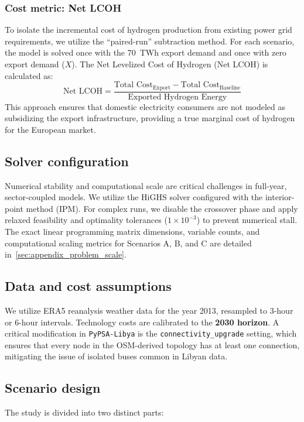 \documentclass[preprint,12pt]{elsarticle}
\begin{document}
\subsubsection{Cost metric: Net LCOH}
To isolate the incremental cost of hydrogen production from existing power grid requirements, we utilize the ``paired-run'' subtraction method. For each scenario, the model is solved once with the 70~TWh export demand and once with zero export demand ($X$). The Net Levelized Cost of Hydrogen (Net LCOH) is calculated as:
\begin{equation}
    \text{Net LCOH} = \frac{\text{Total Cost}_{\text{Export}} - \text{Total Cost}_{\text{Baseline}}}{\text{Exported Hydrogen Energy}}
\end{equation}
This approach ensures that domestic electricity consumers are not modeled as subsidizing the export infrastructure, providing a true marginal cost of hydrogen for the European market.

\subsection{Solver configuration}
Numerical stability and computational scale are critical challenges in full-year, sector-coupled models. We utilize the HiGHS solver configured with the interior-point method (IPM). For complex runs, we disable the crossover phase and apply relaxed feasibility and optimality tolerances ($1 \times 10^{-3}$) to prevent numerical stall. The exact linear programming matrix dimensions, variable counts, and computational scaling metrics for Scenarios A, B, and C are detailed in~\ref{sec:appendix_problem_scale}.

\subsection{Data and cost assumptions}
We utilize ERA5 reanalysis weather data for the year 2013, resampled to 3-hour or 6-hour intervals. Technology costs are calibrated to the \textbf{2030 horizon}. A critical modification in \texttt{PyPSA-Libya} is the \texttt{connectivity\_upgrade} setting, which ensures that every node in the OSM-derived topology has at least one connection, mitigating the issue of isolated buses common in Libyan data.

\subsection{Scenario design}
The study is divided into two distinct parts:
\end{document}
